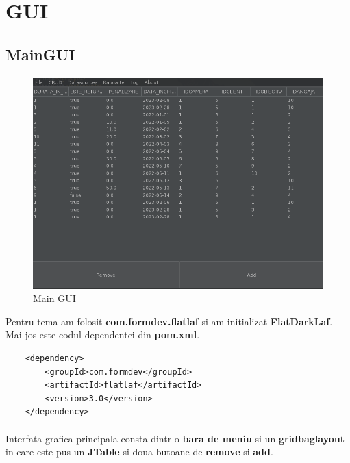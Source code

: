 \documentclass[oneside]{article}
\begin{document}
\section[GUI]{GUI}
\subsection[MainGUI]{MainGUI}
\paragraph{}
\begin{figure}[ht]
    \centering
    \noindent\includegraphics[scale=0.4]{program.png}
    \caption{Main GUI}
    \label{fig:maingui}
\end{figure}

Pentru tema am folosit \textbf{com.formdev.flatlaf} si am initializat \textbf{FlatDarkLaf}. Mai jos este codul dependentei din \textbf{pom.xml}.
\begin{center}
    \begin{lstlisting}
    <dependency>
        <groupId>com.formdev</groupId>
        <artifactId>flatlaf</artifactId>
        <version>3.0</version>
    </dependency>
    \end{lstlisting}
\end{center}

\paragraph{} Interfata grafica principala consta dintr-o \textbf{bara de meniu} si un \textbf{gridbaglayout} in care este pus un \textbf{JTable} si doua butoane de \textbf{remove} si \textbf{add}.
\end{document}
